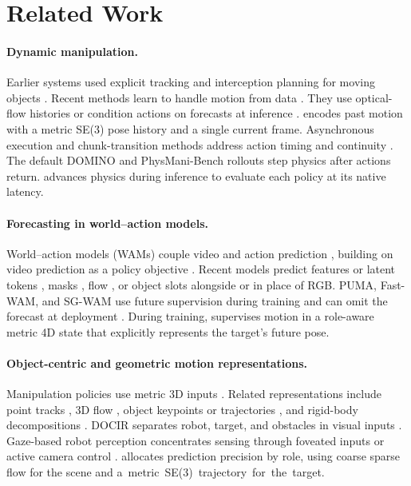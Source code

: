\section{Related Work}
\label{sec:related_work}

\paragraph{Dynamic manipulation.}
Earlier systems used explicit tracking and interception planning for moving objects
\cite{allen1993,baeuml2010,marturi2019dynamic}. Recent methods learn to handle motion
from data \cite{dynawm,dynamicmanip,dynamicvla}. They use optical-flow histories
\cite{domino,dynamicwam} or condition actions on forecasts at inference
\cite{foretime,ahead,physmani}. \ours encodes past motion with a metric SE(3) pose
history and a single current frame. Asynchronous execution and chunk-transition
methods address action timing and continuity \cite{bid,rtc,smolvla,vlash,dynamicvla}.
The default DOMINO \cite{domino} and PhysMani-Bench \cite{physmani} rollouts step
physics after actions return. \bench advances physics during inference to evaluate
each policy at its native latency.



\paragraph{Forecasting in world--action models.}
World--action models (WAMs) couple video and action prediction \cite{uwm,uva,dreamzero,openwam_alpha},
building on video prediction as a policy objective \cite{gr1,seer}. Recent models
predict features or latent tokens \cite{flare,dreamvla,wog}, masks \cite{maskwam}, flow
\cite{dreamwam}, or object slots \cite{oawam} alongside or in place of RGB. PUMA,
Fast-WAM, and SG-WAM use future supervision during training and can omit the forecast
at deployment \cite{domino,fastwam,sgwam}. During training, \ours supervises motion in
a role-aware metric 4D state that explicitly represents the target's future pose.

\paragraph{Object-centric and geometric motion representations.}
Manipulation policies use metric 3D inputs \cite{peract,dp3}. Related representations
include point tracks \cite{atm,track2act,im2flow2act}, 3D flow
\cite{generalflow,flowdreamer,pointworld,physmani}, object keypoints or trajectories
\cite{kpam,spot,objectforesight}, and rigid-body decompositions \cite{se3nets,se3posenets}.
DOCIR separates robot, target, and obstacles in visual inputs \cite{docir}. Gaze-based
robot perception concentrates sensing through foveated inputs
\cite{kim2021gaze,chuang2026lookfocusact} or active camera control \cite{kerr2025eyerobot}.
\ours allocates prediction precision by role, using coarse sparse flow for the scene
and \mbox{a metric SE(3) trajectory for the target.}
